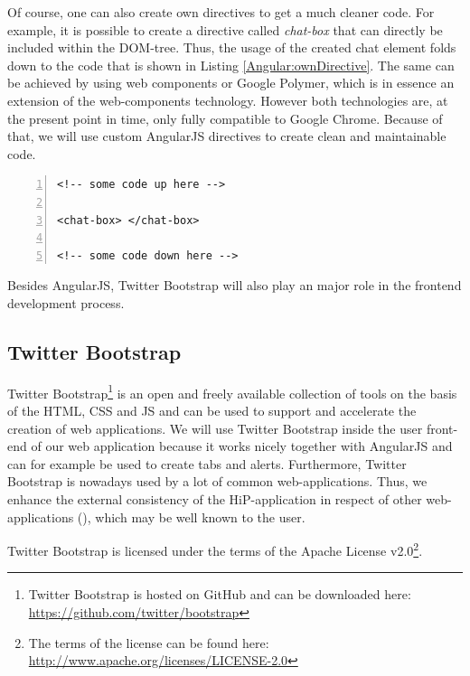 Of course, one can also create own directives to get a much cleaner code. For example, it is possible to create a directive called \textit{chat-box} that can directly be included within the \ac{DOM}-tree. Thus, the usage of the created chat element folds down to the code that is shown in Listing \ref{Angular:ownDirective}. The same can be achieved by using web components or Google Polymer, which is in essence an extension of the web-components technology. However both technologies are, at the present point in time, only fully compatible to Google Chrome. Because of that, we will use custom AngularJS directives to create clean and maintainable code.

\begin{lstlisting}[numbers=left,caption={Simple example that shows the usage of a custom directive},label=Angular:ownDirective,frame=tlbr,breaklines]
<!-- some code up here -->

<chat-box> </chat-box>

<!-- some code down here -->
\end{lstlisting}

Besides AngularJS, Twitter Bootstrap will also play an major role in the frontend development process.
 
\subsection{Twitter Bootstrap}
Twitter Bootstrap\footnote{Twitter Bootstrap is hosted on GitHub and can be downloaded here: \url{https://github.com/twitter/bootstrap}} is an open and freely available collection of tools on the basis of the \ac{HTML}, \ac{CSS} and \ac{JS} and can be used to support and accelerate the creation of web applications. We will use Twitter Bootstrap inside the user front-end of our web application because it works nicely together with AngularJS and can for example be used to create tabs and alerts. Furthermore, Twitter Bootstrap is nowadays used by a lot of common web-applications. Thus, we enhance the external consistency of the \ac{HiP}-application in respect of other web-applications (\cite{lidwell2010universal}), which may be well known to the user. 

Twitter Bootstrap is licensed under the terms of the Apache License v2.0\footnote{The terms of the license can be found here: \url{http://www.apache.org/licenses/LICENSE-2.0}}.

